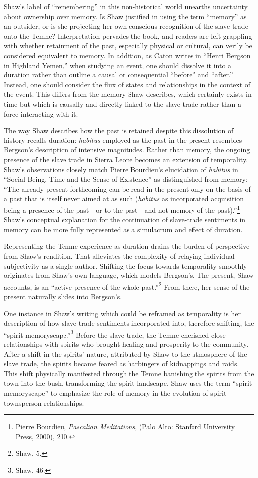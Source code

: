 Shaw's label of ``remembering'' in this non-historical world unearths
uncertainty about ownership over memory. Is Shaw justified in using the
term ``memory'' as an outsider, or is she projecting her own conscious
recognition of the slave trade onto the Temne? Interpretation pervades
the book, and readers are left grappling with whether retainment of the
past, especially physical or cultural, can verily be considered
equivalent to memory. In addition, as Caton writes in ``Henri Bergson in
Highland Yemen,'' when studying an event, one should dissolve it into a
duration rather than outline a causal or consequential ``before'' and
``after.'' Instead, one should consider the flux of states and
relationships in the context of the event. This differs from the memory
Shaw describes, which certainly exists in time but which is causally and
directly linked to the slave trade rather than a force interacting with
it.

The way Shaw describes how the past is retained despite this dissolution
of history recalls duration: \emph{habitus} employed as the past in the
present resembles Bergson's description of intensive magnitudes. Rather
than memory, the ongoing presence of the slave trade in Sierra Leone
becomes an extension of temporality. Shaw's observations closely match
Pierre Bourdieu's elucidation of \emph{habitus} in ``Social Being, Time
and the Sense of Existence'' as distinguished from memory: ``The
already-present forthcoming can be read in the present only
on the basis of a past that is itself never aimed at as such
(\emph{habitus} as incorporated acquisition being a presence of the
past---or to the past---and not memory of the past).''\footnote{Pierre
  Bourdieu, \emph{Pascalian Meditations}, (Palo Alto: Stanford
  University Press, 2000), 210.} Shaw's conceptual explanation for the
continuation of slave-trade sentiments in memory can be more fully
represented as a simulacrum and effect of duration.

Representing the Temne experience as duration drains the burden of
perspective from Shaw's rendition. That alleviates the complexity of
relaying individual subjectivity as a single author. Shifting the focus
towards temporality smoothly originates from Shaw's own language, which
models Bergson's. The present, Shaw accounts, is an ``active presence of
the whole past.''\footnote{Shaw, 5.} From there, her sense of the
present naturally slides into Bergson's.

One instance in Shaw's writing which could be reframed as temporality is
her description of how slave trade sentiments incorporated into,
therefore shifting, the ``spirit memoryscape.''\footnote{Shaw, 46.}
Before the slave trade, the Temne cherished close relationships with
spirits who brought healing and prosperity to the community. After a
shift in the spirits' nature, attributed by Shaw to the atmosphere of
the slave trade, the spirits became feared as harbingers of kidnappings
and raids. This shift physically manifested through the Temne banishing
the spirits from the town into the bush, transforming the spirit
landscape. Shaw uses the term ``spirit memoryscape'' to emphasize the
role of memory in the evolution of spirit-townsperson relationships.


